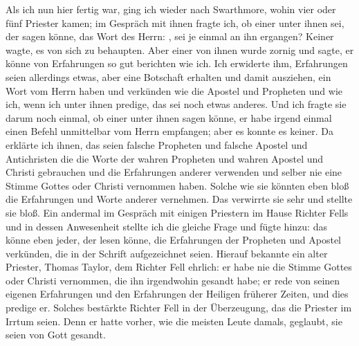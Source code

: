 Als ich nun hier fertig war, ging ich wieder nach 
Swarthmore, wohin vier oder fünf Priester kamen; im Gespräch mit
ihnen fragte ich, ob einer unter ihnen sei, der sagen könne, das
Wort des Herrn: , sei je
einmal an ihn ergangen? Keiner wagte, es von sich zu 
behaupten. Aber einer von ihnen wurde zornig und sagte, er
könne von Erfahrungen so gut berichten wie ich. Ich erwiderte
ihm, Erfahrungen seien allerdings etwas, aber eine Botschaft
erhalten und damit ausziehen, ein Wort vom Herrn haben und
verkünden wie die Apostel und Propheten und wie ich, wenn
ich unter ihnen predige, das sei noch etwas anderes. Und ich
fragte sie darum noch einmal, ob einer unter ihnen sagen könne,
er habe irgend einmal einen Befehl unmittelbar vom Herrn
empfangen; aber es konnte es keiner. Da erklärte ich ihnen, das
seien falsche Propheten und falsche 
Apostel und Antichristen die
die Worte der wahren Propheten und wahren Apostel und Christi
gebrauchen und die Erfahrungen anderer verwenden und selber
nie eine Stimme Gottes oder Christi vernommen haben. Solche
wie sie könnten eben bloß die Erfahrungen und Worte anderer
vernehmen. Das verwirrte sie sehr und stellte sie bloß. Ein
andermal im Gespräch mit einigen Priestern im Hause Richter
Fells und in dessen Anwesenheit stellte ich die gleiche Frage und
fügte hinzu: das könne eben jeder, der lesen könne, die 
Erfahrungen der Propheten und Apostel verkünden, die in der Schrift
aufgezeichnet seien. Hierauf bekannte ein alter Priester, Thomas
Taylor, dem Richter Fell ehrlich: 
er habe nie die Stimme Gottes
oder Christi vernommen, die ihn 
irgendwohin gesandt habe; er
rede von seinen eigenen Erfahrungen und den Erfahrungen der
Heiligen früherer Zeiten, und dies predige er. Solches bestärkte
Richter Fell in der Überzeugung, das die Priester im Irrtum
seien. Denn er hatte vorher, wie die meisten Leute damals,
geglaubt, sie seien von Gott gesandt.

